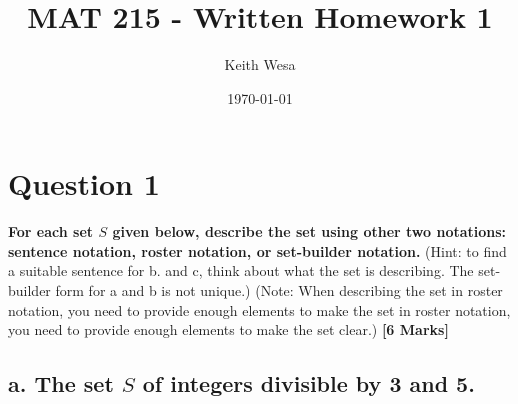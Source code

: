 \documentclass{article}
\author{Keith Wesa}
\title{MAT 215 - Written Homework 1}
\date{\today}
\begin{document}
\section*{Question 1}
\textbf{For each set $S$ given below, describe the set using other two notations: 
sentence notation, roster notation, or set-builder notation.} (Hint: to find a suitable sentence
for b. and c, think about what the set is describing. The set-builder form for a and b is not unique.)
(Note: When describing the set in roster notation, you need to provide enough elements to make 
the set in roster notation, you need to provide enough elements to make the set clear.) \textbf{[6 Marks]}
\subsection*{a. The set $S$ of integers divisible by 3 and 5.}
    
\end{document}
